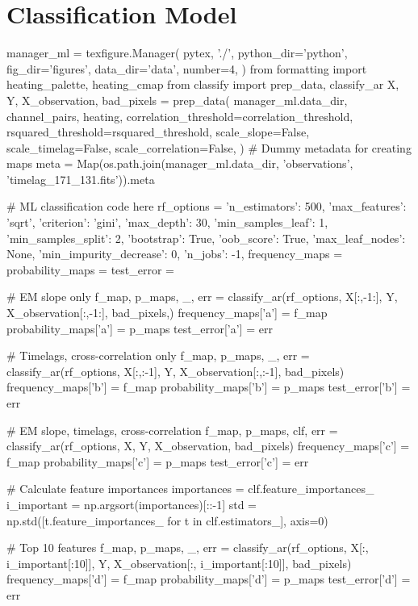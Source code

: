 \section{Classification Model}\label{sec:compare}

\begin{pycode}[manager_ml]
manager_ml = texfigure.Manager(
    pytex, './',
    python_dir='python',
    fig_dir='figures',
    data_dir='data',
    number=4,
)
from formatting import heating_palette, heating_cmap
from classify import prep_data, classify_ar
X, Y, X_observation, bad_pixels = prep_data(
    manager_ml.data_dir,
    channel_pairs,
    heating,
    correlation_threshold=correlation_threshold,
    rsquared_threshold=rsquared_threshold,
    scale_slope=False,
    scale_timelag=False,
    scale_correlation=False,
)
# Dummy metadata for creating maps
meta = Map(os.path.join(manager_ml.data_dir, 'observations', 'timelag_171_131.fits')).meta

# ML classification code here
rf_options = {
    'n_estimators': 500,
    'max_features': 'sqrt',
    'criterion': 'gini',
    'max_depth': 30,
    'min_samples_leaf': 1,
    'min_samples_split': 2,
    'bootstrap': True,
    'oob_score': True,
    'max_leaf_nodes': None,
    'min_impurity_decrease': 0,
    'n_jobs': -1,
}
frequency_maps = {}
probability_maps = {}
test_error = {}

# EM slope only
f_map, p_maps, _, err = classify_ar(rf_options, X[:,-1:], Y, X_observation[:,-1:], bad_pixels,)
frequency_maps['a'] = f_map
probability_maps['a'] = p_maps
test_error['a'] = err

# Timelags, cross-correlation only
f_map, p_maps, _, err = classify_ar(rf_options, X[:,:-1], Y, X_observation[:,:-1], bad_pixels)
frequency_maps['b'] = f_map
probability_maps['b'] = p_maps
test_error['b'] = err

# EM slope, timelags, cross-correlation
f_map, p_maps, clf, err = classify_ar(rf_options, X, Y, X_observation, bad_pixels)
frequency_maps['c'] = f_map
probability_maps['c'] = p_maps
test_error['c'] = err

# Calculate feature importances
importances = clf.feature_importances_
i_important = np.argsort(importances)[::-1]
std = np.std([t.feature_importances_ for t in clf.estimators_], axis=0)

# Top 10 features
f_map, p_maps, _, err = classify_ar(rf_options, X[:, i_important[:10]], Y,
                                    X_observation[:, i_important[:10]], bad_pixels)
frequency_maps['d'] = f_map
probability_maps['d'] = p_maps
test_error['d'] = err
\end{pycode}


